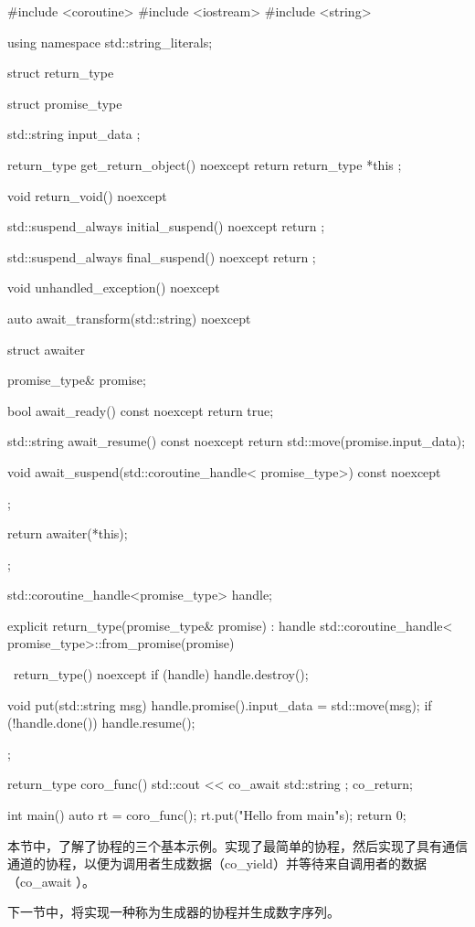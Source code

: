 \begin{cpp}
#include <coroutine>
#include <iostream>
#include <string>

using namespace std::string_literals;

struct return_type {
    struct promise_type {
        std::string input_data { };

        return_type get_return_object() noexcept {
            return return_type{ *this };
        }

        void return_void() noexcept {
        }

        std::suspend_always initial_suspend() noexcept {
            return {};
        }

        std::suspend_always final_suspend() noexcept {
            return {};
        }

        void unhandled_exception() noexcept {
        }

        auto await_transform(std::string) noexcept {
            struct awaiter {
                promise_type& promise;

                bool await_ready() const noexcept {
                    return true;
                }

                std::string await_resume() const noexcept {
                    return std::move(promise.input_data);
                }

                void await_suspend(std::coroutine_handle<
                                   promise_type>) const noexcept {
                }
            };

            return awaiter(*this);
        }
    };

    std::coroutine_handle<promise_type> handle{};

    explicit return_type(promise_type& promise)
        : handle{ std::coroutine_handle<
                            promise_type>::from_promise(promise)} {
    }

    ~return_type() noexcept {
        if (handle) {
            handle.destroy();
        }
    }

    void put(std::string msg) {
        handle.promise().input_data = std::move(msg);
        if (!handle.done()) {
            handle.resume();
        }
    }
};

return_type coro_func() {
    std::cout << co_await std::string{ };
    co_return;
}

int main() {
    auto rt = coro_func();
    rt.put("Hello from main\n"s);
    return 0;
}
\end{cpp}

本节中，了解了协程的三个基本示例。实现了最简单的协程，然后实现了具有通信通道的协程，以便为调用者生成数据（co\_yield）并等待来自调用者的数据（co\_await ）。

下一节中，将实现一种称为生成器的协程并生成数字序列。





